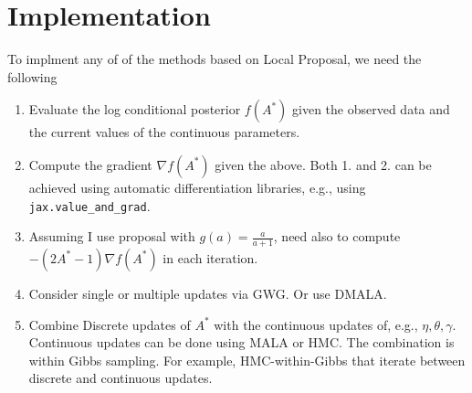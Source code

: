 \documentclass[12pt]{article}
\begin{document}
        \section{Implementation}
         To implment any of of the methods based on Local Proposal, we need the following
         \begin{enumerate}
            \item Evaluate the log conditional posterior $f(A^\ast)$ given the observed
                   data and the current values of the continuous parameters.
            \item Compute the gradient $\nabla f(A^\ast)$ given the above. 
                    Both 1. and 2. can be achieved using automatic differentiation libraries,
                    e.g., using \texttt{jax.value\_and\_grad}.
            \item Assuming I use proposal with $g(a) = \frac{a}{a+1}$, 
                    need also to compute $-(2A^\ast - 1)\nabla f(A^\ast)$ in each iteration.
            \item Consider single or multiple updates via GWG. Or use DMALA.
            \item Combine Discrete updates of $A^\ast$ with the continuous updates of, e.g., $\eta,\theta,\gamma$.
                  Continuous updates can be done using MALA or HMC. 
                  The combination is within Gibbs sampling.
                  For example, HMC-within-Gibbs that iterate between discrete and continuous updates.
        \end{enumerate}

    
\end{document}

